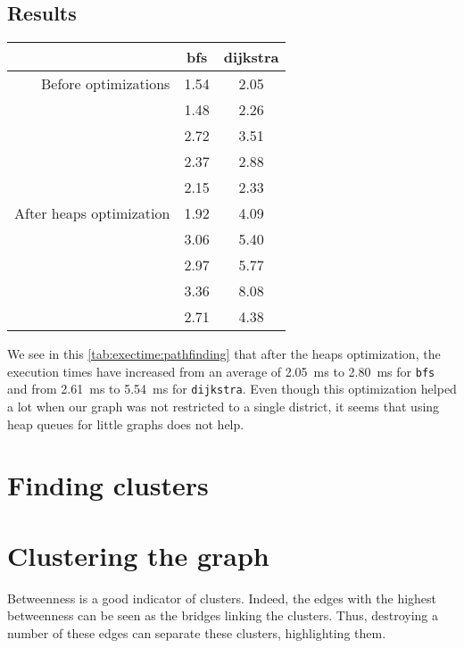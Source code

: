 \documentclass[12pt,english]{article}
\begin{document}
	\subsection{Results}\label{sec:results:2}

	\begin{center}
		\begin{tabular}{r c c}
			& \textbf{\ttfamily bfs} & \textbf{\ttfamily dijkstra}\\
			\hline\hline
			Before optimizations & \num{1.54} & \num{2.05}\\
			& \num{1.48} & \num{2.26}\\
			& \num{2.72} & \num{3.51}\\
			& \num{2.37} & \num{2.88}\\
			& \num{2.15} & \num{2.33}\\
			\hline
			After heaps optimization & \num{1.92} & \num{4.09}\\
			& \num{3.06} & \num{5.40}\\
			& \num{2.97} & \num{5.77}\\
			& \num{3.36} & \num{8.08}\\
			& \num{2.71} & \num{4.38}\\
		\end{tabular}
		\label{tab:exectime:pathfinding}
	\end{center}
	We see in this \autoref{tab:exectime:pathfinding} that after the heaps optimization, the execution times have increased from an average of \SI{2.05}{\milli\second} to \SI{2.80}{\milli\second} for \texttt{bfs} and from \SI{2.61}{\milli\second} to \SI{5.54}{\milli\second} for \texttt{dijkstra}.
	Even though this optimization helped a lot when our graph was not restricted to a single district, it seems that using heap queues for little graphs does not help.

	\section{Finding clusters}\label{sec:step:3}

	\section{Clustering the graph}\label{sec:step:2}

	Betweenness is a good indicator of clusters.
	Indeed, the edges with the highest betweenness can be seen as the bridges linking the clusters.
	Thus, destroying a number of these edges can separate these clusters, highlighting them.
\end{document}
